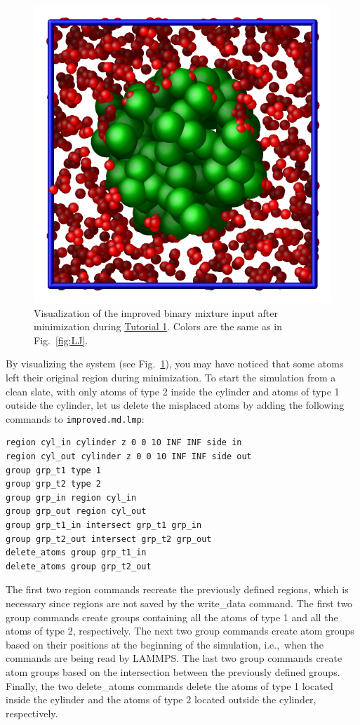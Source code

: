 \documentclass[9pt,tutorial]{livecoms}
\newcommand{\lmpcmd}[1]{\colorbox{listing}{\textcolor{command}{\small{#1}}}} %
\newcommand{\flecmd}[1]{\textcolor{command}{\texttt{#1}}} %
\begin{document}
\begin{figure}
\centering
\includegraphics[width=0.55\linewidth]{LJ-cylinder}
\caption{Visualization of the improved binary mixture input after minimization
  during \hyperref[lennard-jones-label]{Tutorial 1}.  Colors are the same as in
  Fig.~\ref{fig:LJ}.}
\label{fig:improved-min}
\end{figure}

By visualizing the system (see Fig.~\ref{fig:improved-min}), you may
have noticed that some atoms left their original region during
minimization.  To start the simulation from a clean slate, with only
atoms of type 2 inside the cylinder and atoms of type 1 outside the
cylinder, let us delete the misplaced atoms by adding the following
commands to \flecmd{improved.md.lmp}:

\begin{lstlisting}
region cyl_in cylinder z 0 0 10 INF INF side in
region cyl_out cylinder z 0 0 10 INF INF side out
group grp_t1 type 1
group grp_t2 type 2
group grp_in region cyl_in
group grp_out region cyl_out
group grp_t1_in intersect grp_t1 grp_in
group grp_t2_out intersect grp_t2 grp_out
delete_atoms group grp_t1_in
delete_atoms group grp_t2_out
\end{lstlisting}
The first two \lmpcmd{region} commands recreate the previously defined
regions, which is necessary since regions are not saved by the
\lmpcmd{write\_data} command.  The first two \lmpcmd{group} commands
create groups containing all the atoms of type 1 and all the
atoms of type 2, respectively.  The next two \lmpcmd{group} commands
create atom groups based on their positions at the beginning of the
simulation, i.e.,~when the commands are being read by LAMMPS.  The last
two \lmpcmd{group} commands create atom groups based on the intersection
between the previously defined groups.  Finally, the two
\lmpcmd{delete\_atoms} commands delete the atoms of type 1
located inside the cylinder and the atoms of type 2 located
outside the cylinder, respectively.
\end{document}
